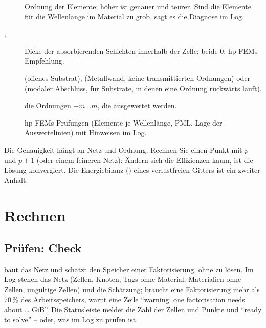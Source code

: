 \begin{description}
  \item[] Ordnung der Elemente; höher ist genauer und teurer. Sind die
    Elemente für die Wellenlänge im Material zu grob, sagt es die Diagnose im Log.
  \item[, ] Dicke der absorbierenden Schichten innerhalb der Zelle;
    beide 0: hp-FEMs Empfehlung.
  \item[]  (offenes Substrat),  (Metallwand, keine transmittierten
    Ordnungen) oder  (modaler Abschluss, für Substrate, in denen eine Ordnung rückwärts
    läuft).
  \item[] die Ordnungen $-m \ldots m$, die ausgewertet werden.
  \item[] hp-FEMs Prüfungen (Elemente je Wellenlänge, PML, Lage der
    Auswertelinien) mit Hinweisen im Log.
\end{description}

\begin{hinweis}
Die Genauigkeit hängt an Netz und Ordnung. Rechnen Sie einen Punkt mit $p$ und $p+1$ (oder einem
feineren Netz): Ändern sich die Effizienzen kaum, ist die Lösung konvergiert. Die Energiebilanz
() eines verlustfreien Gitters ist ein zweiter Anhalt.
\end{hinweis}

\section{Rechnen}\label{sec:hp-rechnen}

\subsection{Prüfen: Check}\label{sec:hp-check}

 baut das Netz und schätzt den Speicher einer Faktorisierung, ohne zu lösen. Im Log
stehen das Netz (Zellen, Knoten, Tags ohne Material, Materialien ohne Zellen, ungültige Zellen)
und die Schätzung; braucht eine Faktorisierung mehr als 70\,\% des Arbeitsspeichers, warnt eine
Zeile \enquote{warning: one factorisation needs about … GiB}. Die Statusleiste meldet die Zahl der
Zellen und Punkte und \enquote{ready to solve} -- oder, was im Log zu prüfen ist.

